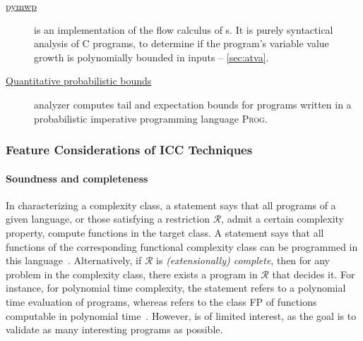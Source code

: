 \begin{description}
\item[\href{https://github.com/statycc/pymwp}{pymwp}]%
      \cite{aubert2023b}
      is an implementation of the flow calculus of s. It is
      purely syntactical analysis of C programs, to determine if the
      program's variable value growth is polynomially bounded in inputs --
      \autoref{sec:atva}.

\item[\href{https://zenodo.org/records/10457566}
     {Quantitative probabilistic bounds}]\cite{chatterjee2024}
      analyzer computes tail and expectation bounds for programs written
      in a probabilistic imperative programming language \textsc{Prog}.

\end{description}

\subsubsection{Feature Considerations of ICC Techniques}
\label{icc-feat}

\paragraph*{Soundness and completeness}
In characterizing a complexity class, a
\emph{} statement says that all programs of a given language, or
those satisfying a restriction \(\mathcal{R}\), admit a
certain complexity property, \ie compute functions in the target class. A
\emph{} statement says that all functions of the corresponding
functional complexity class can be programmed in this
language~\cite{baillot2012}. Alternatively, if
\(\mathcal{R}\) is \emph{(extensionally)
complete}, then for any problem in the
complexity class, there exists a program in
\(\mathcal{R}\) that decides it. For instance, for polynomial
time complexity, the  statement refers to a polynomial
time evaluation of programs, whereas  refers to the class FP
of functions computable in polynomial time~\cite{baillot2012}. However,
 is of limited interest, as the goal is to
validate as many interesting programs as possible.

